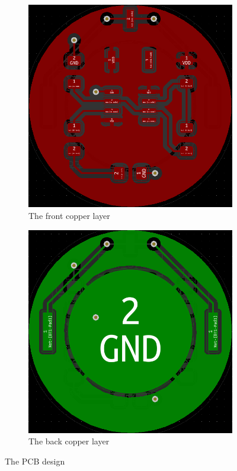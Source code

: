 \documentclass[10pt,twocolumn]{article}
\begin{document}
\begin{figure}[H]
\centering
\begin{subfigure}{0.45\linewidth}
  \centering
  \includegraphics[width=1\linewidth]{images/PCB-front.png}
  \caption{The front copper layer}
  \label{fig5sub1}
\end{subfigure}
\begin{subfigure}{0.45\linewidth}
  \centering
  \includegraphics[width=1\linewidth]{images/PCB-back.png}
  \caption{The back copper layer}
  \label{fig5sub2}
\end{subfigure}
\caption{The PCB design}
\label{fig:test}
\end{figure}
\end{document}

